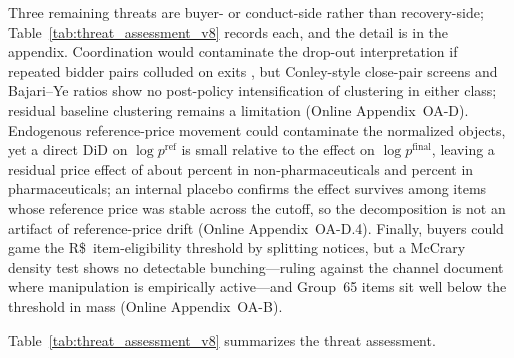 Three remaining threats are buyer- or conduct-side rather than
recovery-side; Table~\ref{tab:threat_assessment_v8} records each, and the
detail is in the appendix. Coordination would contaminate the drop-out
interpretation if repeated bidder pairs colluded on exits
\citep{kawainakabayashi2022}, but Conley-style close-pair screens
\citep{conley2016} and Bajari--Ye ratios \citep{bajariye2003} show no
post-policy intensification of clustering in either class; residual baseline
clustering remains a limitation (Online Appendix~OA-D). Endogenous
reference-price movement could contaminate the normalized objects, yet a
direct DiD on $\log p^{\mathrm{ref}}$ is small relative to the effect on
$\log p^{\mathrm{final}}$, leaving a residual price effect of about
\pRefResidPctNp{} percent in non-pharmaceuticals and \pRefResidPctPh{}
percent in pharmaceuticals; an internal placebo confirms the effect survives
among items whose reference price was stable across the cutoff, so the
decomposition is not an artifact of reference-price drift (Online
Appendix~OA-D.4). Finally, buyers could game the
R\$\,\setAsideThreshBRL{} item-eligibility threshold by splitting notices,
but a McCrary density test shows no detectable bunching---ruling against the
channel \citet{coviello2026} document where manipulation is empirically
active---and Group~65 items sit well below the threshold in mass (Online
Appendix~OA-B).

Table~\ref{tab:threat_assessment_v8} summarizes the threat assessment.

